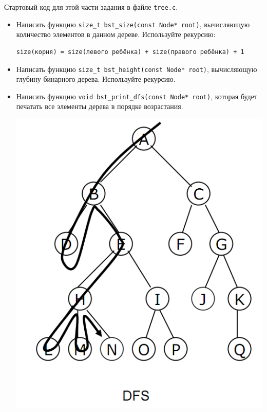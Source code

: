 \documentclass{article}
\begin{document}
Стартовый код для этой части задания в файле \texttt{tree.c}.
\begin{itemize}
\item Написать функцию \texttt{size\_t bst\_size(const Node* root)}, вычисляющую количество элементов в данном дереве. Используйте рекурсию:
\begin{verbatim}
size(корня) = size(левого ребёнка) + size(правого ребёнка) + 1
\end{verbatim}
\item Написать функцию \texttt{size\_t bst\_height(const Node* root)}, вычисляющую глубину бинарного дерева. Используйте рекурсию.
\item Написать функцию \texttt{void bst\_print\_dfs(const Node* root)}, которая будет печатать все элементы дерева в порядке возрастания.
\begin{multicols}{2}
\noindent
\begin{center}
\includegraphics[scale=0.24]{../images/dfs.png}
\end{center}
\columnbreak
\begin{center}

\end{center}
\end{multicols}
\end{itemize}
\end{document}
